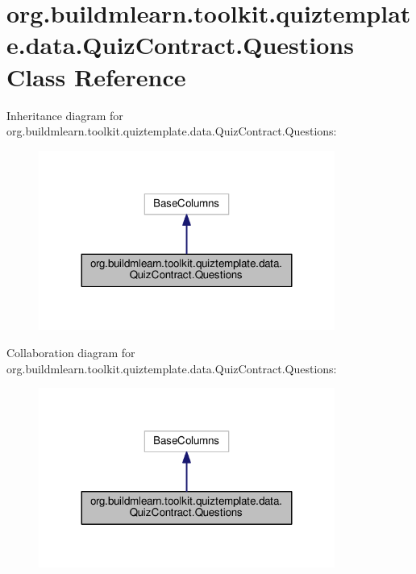 \hypertarget{classorg_1_1buildmlearn_1_1toolkit_1_1quiztemplate_1_1data_1_1QuizContract_1_1Questions}{}\section{org.\+buildmlearn.\+toolkit.\+quiztemplate.\+data.\+Quiz\+Contract.\+Questions Class Reference}
\label{classorg_1_1buildmlearn_1_1toolkit_1_1quiztemplate_1_1data_1_1QuizContract_1_1Questions}


Inheritance diagram for org.\+buildmlearn.\+toolkit.\+quiztemplate.\+data.\+Quiz\+Contract.\+Questions\+:
\nopagebreak
\begin{figure}[H]
\begin{center}
\leavevmode
\includegraphics[width=275pt]{classorg_1_1buildmlearn_1_1toolkit_1_1quiztemplate_1_1data_1_1QuizContract_1_1Questions__inherit__graph}
\end{center}
\end{figure}


Collaboration diagram for org.\+buildmlearn.\+toolkit.\+quiztemplate.\+data.\+Quiz\+Contract.\+Questions\+:
\nopagebreak
\begin{figure}[H]
\begin{center}
\leavevmode
\includegraphics[width=275pt]{classorg_1_1buildmlearn_1_1toolkit_1_1quiztemplate_1_1data_1_1QuizContract_1_1Questions__coll__graph}
\end{center}
\end{figure}
